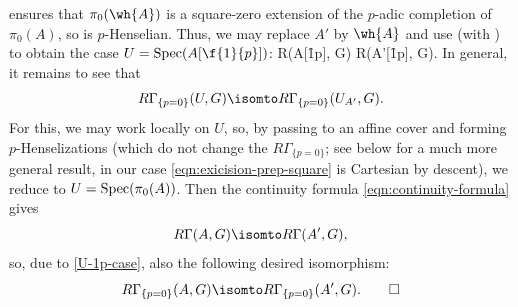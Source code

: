 \bpf
{} ensures that $\pi_0(\wh{A})$ is a square-zero extension of the $p$-adic completion of $\pi_0(A)$, so is $p$-Henselian. Thus, we may replace $A'$ by $\wh{A}$ and use  (with ) to obtain the case $U = \Spec(A[\f{1}{p}])$:
\be {}
\tst R\Gamma(A[\f 1p], G) \isomto R\Gamma(A'[\f 1p], G).
\ee
In general, it remains to see that
\[
R\Gamma_{\{p = 0\}}(U, G) \isomto R\Gamma_{\{p = 0\}}(U_{A'}, G).
\]
 For this, we may work locally on $U$, so, by passing to an affine cover and forming $p$-Henselizations (which do not change the $R\Gamma_{\{ p = 0\}}$; see  below for a much more general result, in our case \eqref{eqn:exicision-prep-square} is Cartesian by descent), we reduce to $U = \operatorname{Spec}(\pi_0(A))$. Then  the continuity formula \eqref{eqn:continuity-formula} gives
 \[
 R\Gamma(A, G) \isomto R\Gamma(A', G),
 \]
 so, due to \eqref{U-1p-case}, also the following desired isomorphism:
 \[
 R\Gamma_{\{p = 0\}}(A, G) \isomto R\Gamma_{\{p = 0\}}(A', G). \qedhere
 \]
\epf



